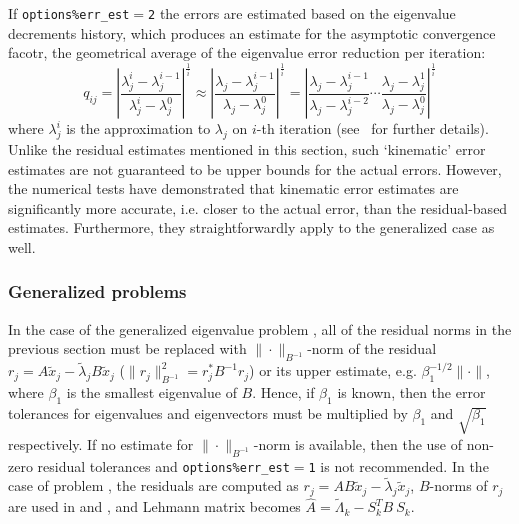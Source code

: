 If {\tt options\%err\_est$=$2}
the errors are estimated
based on the eigenvalue decrements history,
which produces an estimate for 
the asymptotic convergence facotr,
the geometrical average of
the eigenvalue error reduction per iteration:
%
\begin{equation}
\label{acf}
q_{ij} =
\left|
\frac
{\lambda_j^i - \lambda_j^{i-1}}
{\lambda_j^i - \lambda_j^0}
\right|^\frac{1}{i}
\approx
\left|
\frac
{\lambda_j - \lambda_j^{i-1}}
{\lambda_j - \lambda_j^0}
\right|^\frac{1}{i}
=
\left|
\frac
{\lambda_j - \lambda_j^{i-1}}
{\lambda_j - \lambda_j^{i-2}}
\cdots
\frac
{\lambda_j - \lambda_j^1}
{\lambda_j - \lambda_j^0}
\right|^\frac{1}{i}
\end{equation}
%
where $\lambda_j^i$ is the approximation to $\lambda_j$ on
$i$-th iteration
(see \report\ for further details).
Unlike the residual estimates mentioned in this section, 
such `kinematic' error estimates are
not guaranteed to be upper bounds for the actual errors.
However, the numerical tests have demonstrated
that kinematic error estimates 
are significantly more accurate,
i.e. closer to the actual error,
than the residual-based estimates. 
Furthermore, they straightforwardly
apply to the generalized case as well.

\subsubsection{Generalized problems}

In the case
of the generalized eigenvalue problem ,
all of the residual norms in the previous section must be replaced
with %
$\|\cdot\|_{B^{-1}}$-norm of the residual
$r_j = A \tilde x_j - \tilde\lambda_j B \tilde x_j$
($\|r_j\|_{B^{-1}}^2 = r_j^* B^{-1} r_j$)
or its upper estimate, e.g. 
$\beta_1^{-1/2}\|\cdot\|$,
where $\beta_1$ is the smallest eigenvalue of $B$.
Hence, if $\beta_1$ is known, then
the error tolerances for eigenvalues and eigenvectors
must be multiplied by $\beta_1$ and $\sqrt{\beta_1}$
respectively. If no estimate for $\|\cdot\|_{B^{-1}}$-norm
is available, then the use of
non-zero residual tolerances and
{\tt options\%err\_est$=$1}
is not recommended.
In the case of problem ,
the residuals are computed as
$r_j = A B \tilde x_j - \tilde \lambda_j \tilde x_j$,
$B$-norms of $r_j$ are used in  and ,
and Lehmann matrix becomes
$\hat A = \tilde\Lambda_k - S_k^T B\ S_k$.

